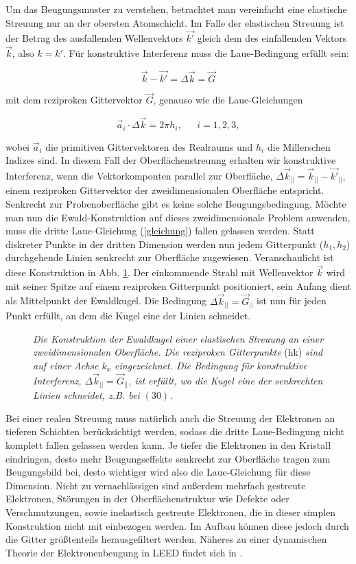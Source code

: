 Um das Beugungsmuster zu verstehen, betrachtet man vereinfacht eine elastische
Streuung nur an der obersten Atomschicht. Im Falle der elastischen Streuung ist
der Betrag des ausfallenden Wellenvektors $\vec{k'}$ gleich dem des
einfallenden Vektors $\vec{k}$, also $k=k'$. Für konstruktive Interferenz
muss die Laue-Bedingung erfüllt sein:

\[\vec{k}-\vec{k'}=\Delta \vec{k}=\vec{G}\]

mit dem reziproken Gittervektor $\vec{G}$, genauso wie die Laue-Gleichungen

\begin{equation}
\vec{a}_i\cdot \Delta \vec{k}=2\pi h_i,~~~~~~~i=1, 2, 3,
\label{gleichung}
\end{equation}

wobei $\vec{a}_i$ die primitiven Gittervektoren des Realraums und $h_i$ die Millerschen Indizes
sind. In diesem Fall der Oberflächenstreuung erhalten wir konstruktive Interferenz,
wenn die Vektorkomponten parallel zur Oberfläche, $\Delta\vec{k}_{||}=\vec{k}_{||}-\vec{k'}_{||}$,
einem reziproken Gittervektor der zweidimensionalen Oberfläche entspricht. Senkrecht zur Probenoberfläche
gibt es keine solche Beugungsbedingung. Möchte man nun die Ewald-Konstruktion auf dieses
zweidimensionale Problem anwenden, muss die dritte Laue-Gleichung (\ref{gleichung}) fallen gelassen
werden.
Statt diskreter Punkte in der dritten Dimension werden nun jedem Gitterpunkt ($h_1, h_2$) durchgehende
Linien senkrecht zur Oberfläche zugewiesen. Veranschaulicht ist diese Konstruktion in Abb.
\ref{ewald}. Der einkommende Strahl mit Wellenvektor $\vec{k}$ wird mit seiner Spitze auf einem
reziproken Gitterpunkt positioniert, sein Anfang dient als Mittelpunkt der Ewaldkugel. Die
Bedingung $\Delta \vec{k}_{||}=\vec{G}_{||}$ ist nun für jeden Punkt erfüllt, an dem die Kugel eine
der Linien schneidet. 

\begin{figure}[H]
\centering
\sffamily 

\caption{\textit{Die Konstruktion der Ewaldkugel einer elastischen Streuung an einer
zweidimensionalen Oberfläche. Die reziproken Gitterpunkte} (hk) \textit{sind auf einer Achse $k_x$
eingezeichnet. Die Bedingung für konstruktive Interferenz, $\Delta \vec{k}_{||}=\vec{G}_{||}$,  ist erfüllt, wo die Kugel eine der senkrechten Linien
schneidet, z.B. bei $(30)$. }}
\label{ewald}
\end{figure}

Bei einer realen Streuung muss natürlich auch die Streuung der Elektronen an tief\-eren
Schichten berücksichtigt werden, sodass die dritte Laue-Bedingung nicht komplett fallen gelassen werden
kann. Je tiefer die Elektronen in den Kristall eindringen, desto mehr Beugungseffekte senkrecht zur
Oberfläche tragen zum Beugungsbild bei, desto wichtiger wird also die Laue-Gleichung für diese
Dimension. Nicht zu vernachlässigen sind außerdem mehrfach gestreute Elektronen, Störungen in der
Oberflächenstruktur wie Defekte oder Verschmutzungen, sowie inelastisch gestreute Elektronen, die in
dieser simplen Konstruktion nicht mit einbezogen werden. Im Aufbau können diese jedoch durch die
Gitter größtenteils herausgefiltert werden. Näheres zu einer dynamischen Theorie der
Elektronenbeugung in LEED findet sich in \cite{Lueth}.

\FloatBarrier










